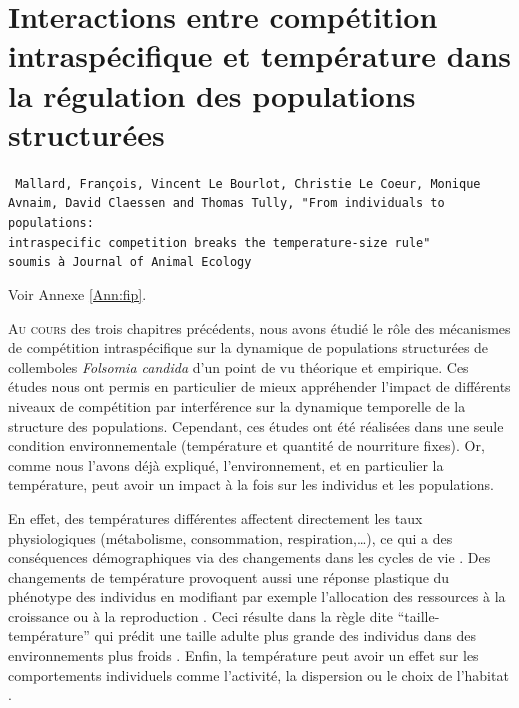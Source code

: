 \chapter{Interactions entre compétition intraspécifique et température dans la
régulation des populations structurées}
\label{chap:fip}

\vspace{2cm}
\begin{Spacing}{1}
\texttt{
Mallard, François, Vincent Le Bourlot, Christie Le Coeur, Monique Avnaim, David
Claessen and Thomas Tully, "From individuals to populations: \\intraspecific
competition breaks the temperature-size rule"\\
soumis à Journal of Animal Ecology}
\end{Spacing}
Voir Annexe \ref{Ann:fip}.
\vspace{2cm}


\lettrine[lines=3]{A}{u cours} des trois chapitres précédents, nous avons étudié
le rôle des mécanismes de compétition intraspécifique sur la dynamique de
populations structurées de collemboles \textit{Folsomia candida} d'un point de vu théorique
et empirique. Ces études nous ont permis en particulier de mieux appréhender
l'impact de différents niveaux de compétition par interférence sur la
dynamique temporelle de la structure des populations. Cependant, ces études ont
été réalisées dans une seule condition environnementale (température et
quantité de nourriture fixes).
Or, comme nous l'avons déjà expliqué, l'environnement, et en particulier la température, peut
avoir un impact à la fois sur les individus et les populations. 

En effet, des températures différentes affectent directement les taux
physiologiques (métabolisme, consommation, respiration,\ldots), ce qui a des
conséquences démographiques via des changements dans les cycles de vie
\autocites{gillooly2002a,le-galliard2012a}. Des changements de température
provoquent aussi une réponse plastique du phénotype des individus en modifiant
par exemple l'allocation des ressources à la croissance ou à la reproduction
\autocites{liefting2010temperature,gutteling2007mapping}. Ceci résulte dans la
règle dite ``taille-température'' qui prédit une taille adulte plus grande des
individus dans des environnements plus froids
\autocites{atkinson1994a,atkinson1996a,angilletta2009a}. Enfin, la température
peut avoir un effet sur les comportements individuels comme l'activité, la
dispersion ou le choix de l'habitat
\autocites{atacho2013a,bonte2008thermal,vanbeest2012temperature}.

